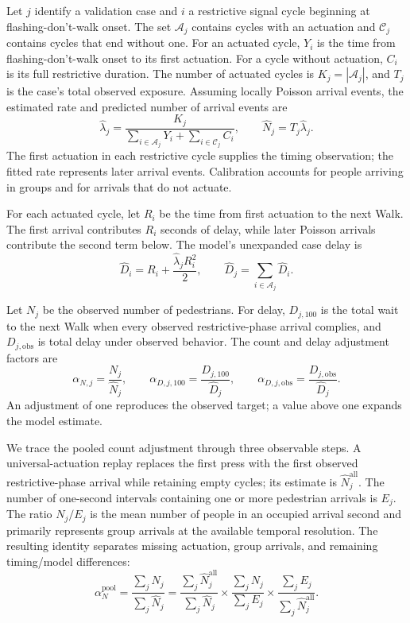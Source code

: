 \documentclass[11pt]{article}
\begin{document}
Let \(j\) identify a validation case and \(i\) a restrictive signal cycle beginning at flashing-don't-walk onset. The set \(\mathcal A_j\) contains cycles with an actuation and \(\mathcal C_j\) contains cycles that end without one. For an actuated cycle, \(Y_i\) is the time from flashing-don't-walk onset to its first actuation. For a cycle without actuation, \(C_i\) is its full restrictive duration. The number of actuated cycles is \(K_j=|\mathcal A_j|\), and \(T_j\) is the case's total observed exposure. Assuming locally Poisson arrival events, the estimated rate and predicted number of arrival events are
\begin{equation}
\widehat\lambda_j=
\frac{K_j}{\sum_{i\in\mathcal A_j}Y_i+\sum_{i\in\mathcal C_j}C_i},
\qquad
\widehat N_j=T_j\widehat\lambda_j .
\label{eq:rate}
\end{equation}
The first actuation in each restrictive cycle supplies the timing observation; the fitted rate represents later arrival events. Calibration accounts for people arriving in groups and for arrivals that do not actuate.

For each actuated cycle, let \(R_i\) be the time from first actuation to the next Walk. The first arrival contributes \(R_i\) seconds of delay, while later Poisson arrivals contribute the second term below. The model's unexpanded case delay is
\begin{equation}
\widehat D_i=R_i+\frac{\widehat\lambda_jR_i^2}{2},
\qquad
\widehat D_j=\sum_{i\in\mathcal A_j}\widehat D_i .
\label{eq:delay}
\end{equation}

Let \(N_j\) be the observed number of pedestrians. For delay, \(D_{j,100}\) is the total wait to the next Walk when every observed restrictive-phase arrival complies, and \(D_{j,\mathrm{obs}}\) is total delay under observed behavior. The count and delay adjustment factors are
\begin{equation}
\alpha_{N,j}=\frac{N_j}{\widehat N_j},
\qquad
\alpha_{D,j,100}=\frac{D_{j,100}}{\widehat D_j},
\qquad
\alpha_{D,j,\mathrm{obs}}=\frac{D_{j,\mathrm{obs}}}{\widehat D_j}.
\label{eq:alpha}
\end{equation}
An adjustment of one reproduces the observed target; a value above one expands the model estimate.

We trace the pooled count adjustment through three observable steps. A universal-actuation replay replaces the first press with the first observed restrictive-phase arrival while retaining empty cycles; its estimate is \(\widehat N^{\mathrm{all}}_j\). The number of one-second intervals containing one or more pedestrian arrivals is \(E_j\). The ratio \(N_j/E_j\) is the mean number of people in an occupied arrival second and primarily represents group arrivals at the available temporal resolution. The resulting identity separates missing actuation, group arrivals, and remaining timing/model differences:
\begin{equation}
\alpha_N^{\mathrm{pool}}
=\frac{\sum_j N_j}{\sum_j\widehat N_j}
=\frac{\sum_j\widehat N^{\mathrm{all}}_j}{\sum_j\widehat N_j}
\times\frac{\sum_jN_j}{\sum_jE_j}
\times\frac{\sum_jE_j}{\sum_j\widehat N^{\mathrm{all}}_j}.
\label{eq:decomposition}
\end{equation}
\end{document}
